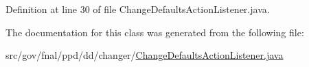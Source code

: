 Definition at line 30 of file Change\-Defaults\-Action\-Listener.\-java.



The documentation for this class was generated from the following file\-:\begin{DoxyCompactItemize}
\item 
src/gov/fnal/ppd/dd/changer/\hyperlink{ChangeDefaultsActionListener_8java}{Change\-Defaults\-Action\-Listener.\-java}\end{DoxyCompactItemize}
